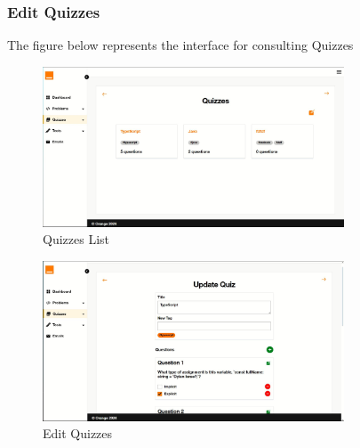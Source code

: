     \subsubsection{Edit Quizzes}
    The figure below represents the interface for consulting Quizzes
    \begin{figure}[h!]
        \centering*
        \includegraphics[width=0.8\textwidth]{images/QUIZZEdit.JPG}
        \caption{ Quizzes List}
        \label{fig:Quizzes List}
    \end{figure}
    \begin{figure}[h!]
        \centering*
        \includegraphics[width=0.8\textwidth]{images/quizedit.JPG}
        \caption{Edit Quizzes}
        \label{fig:Edite Quizzes}
    \end{figure}
    \newpage
